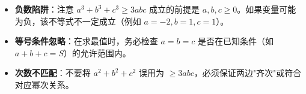 \begin{trapbox}
\begin{itemize}
    \item \textbf{负数陷阱}：注意 $a^3+b^3+c^3 \geqslant 3abc$ 成立的前提是 $a,b,c \geqslant 0$。如果变量可能为负，该不等式不一定成立（例如 $a=-2, b=1, c=1$）。
    \item \textbf{等号条件忽略}：在求最值时，务必检查 $a=b=c$ 是否在已知条件（如 $a+b+c=S$）的允许范围内。
    \item \textbf{次数不匹配}：不要将 $a^2+b^2+c^2$ 误用为 $\geqslant 3abc$，必须保证两边"齐次"或符合对应幂次关系。
\end{itemize}
\end{trapbox}